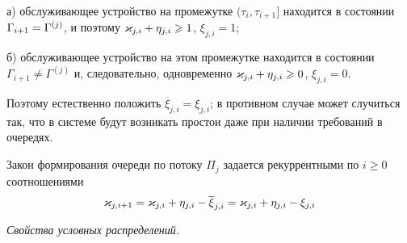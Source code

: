 \documentclass[a4paper,14pt,russian]{article}
\newcommand{\G}{\Gamma}
\newcommand{\Gr}[1]{\Gamma^{(#1)}}
\begin{document}
а) обслуживающее устройство на промежутке $(\tau_i, \tau_{i+1}]$ находится в состоянии $\G_{i+1} \hm= \Gr{j}$, и поэтому $\varkappa_{j,i} + \eta_{j,i} \geqslant 1$, $\xi_{j,i} = 1$;

б) обслуживающее устройство на этом промежутке находится в состоянии $\G_{i+1} \neq \Gr{j}$ и, следовательно, одновременно $\varkappa_{j,i} + \eta_{j,i} \geqslant 0$, $\xi_{j,i} = 0$.

Поэтому естественно положить $\overline{\xi}_{j,i} = \xi_{j,i}$; в противном случае может случиться так, что в системе будут возникать простои даже при наличии требований в очередях.

Закон формирования очереди по потоку $\Pi_j$ задается рекуррентными по $i \geqslant 0$ соотношениями
\begin{equation}
\varkappa_{j,i+1} = \varkappa_{j,i} + \eta_{j,i} - \overline{\xi}_{j,i} = \varkappa_{j,i} + \eta_{j,i} - \xi_{j,i}
\label{queue_func}
\end{equation}


\textit{Свойства условных распределений.}
\end{document}
